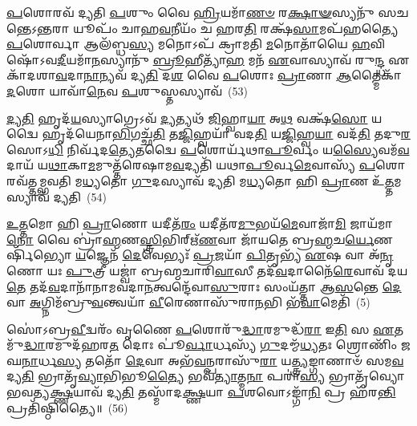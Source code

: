 \-\ul{𑌪}\-𑌶𑍋𑌰𑌵᳴ 𑌦𑍍𑌯𑌤𑌿 \ul{𑌪}\-𑌶𑍁𑌂 𑌵𑍈 \ul{𑌹𑍍𑌰𑌿}\-𑌯𑌮𑌾᳴\-\ul{𑌣}\-\-\ul{𑍞} 𑌰\-\ul{𑌕𑍍𑌷𑌾}\-\-\ul{𑍟}\-𑌸𑍍𑌯𑌨𑍁᳴ 𑌸𑌚𑌨𑍍𑌤𑍇\-𑌽\-\ul{𑌨𑍍𑌤}\-𑌰𑌾 𑌯𑍂𑌪𑌂᳴ 𑌚𑌾𑌹\-\ul{𑌵}\-𑌨𑍀𑌯𑌂᳴ 𑌚 𑌹𑌰\-\ul{𑌤𑌿} 𑌰𑌕𑍍𑌷᳴\-\ul{𑌸𑌾}\-𑌮𑌪᳴𑌹𑌤𑍍𑌯𑍈 \ul{𑌪}\-𑌶𑍋𑌰𑍍𑌵𑌾 𑌆𑌲᳴𑌬𑍍𑌧\-\ul{𑌸𑍍𑌯} 𑌮𑌨𑍋\-𑌽𑌪᳴ 𑌕𑍍𑌰𑌾𑌮𑌤𑌿 \ul{𑌮}\-𑌨𑍋𑌤𑌾᳴𑌯𑍈 \ul{𑌹}\-𑌵𑌿𑌷𑍋᳴\-𑌽𑌵\-\ul{𑌦𑍀}\-𑌯𑌮𑌾᳴\-\ul{𑌨}\-𑌸𑍍𑌯𑌾𑌨𑍁᳴ \ul{𑌬𑍍𑌰𑍂}\-𑌹𑍀𑌤𑍍𑌯𑌾᳴\-\ul{𑌹} 𑌮𑌨᳴ \ul{𑌏}\-𑌵𑌾𑌸𑍍𑌯𑌾𑌵᳴ 𑌰𑍁\-\ul{𑌨𑍍𑌦𑍍𑌧} 𑌏𑌕𑌾᳴\-𑌦𑌶𑌾\-\ul{𑌵}\-𑌦𑌾\-\ul{𑌨𑌾}\-𑌨𑍍𑌯𑌵᳴ 𑌦𑍍𑌯\-\ul{𑌤𑌿} 𑌦\-\ul{𑌶} 𑌵𑍈 \ul{𑌪}\-𑌶𑍋𑌃 \ul{𑌪𑍍𑌰𑌾}\-𑌣𑌾 \ul{𑌆}\-𑌤𑍍𑌮𑍈𑌕𑌾᳴\-\ul{𑌦}\-𑌶𑍋 𑌯𑌾𑌵𑌾᳴\-\ul{𑌨𑍇}\-𑌵 \ul{𑌪}\-𑌶𑍁𑌸𑍍𑌤𑌸𑍍𑌯𑌾𑌵᳴~(53)

\-\ul{𑌦𑍍𑌯}\-\-\ul{𑌤𑌿} 𑌹𑍃𑌦᳴\-\ul{𑌯}\-𑌸𑍍𑌯𑌾𑌗𑍍𑌰𑍇\-𑌽𑌵᳴ \ul{𑌦𑍍𑌯}\-𑌤𑍍𑌯𑌥᳴ \ul{𑌜𑌿}\-𑌹𑍍𑌵𑌾\-\ul{𑌯𑌾} 𑌅\-\ul{𑌥} 𑌵𑌕𑍍𑌷᳴\-\ul{𑌸𑍋} 𑌯𑌦𑍍𑌵𑍈 𑌹𑍃𑌦᳴𑌯𑍇𑌨𑌾\-\ul{𑌭𑌿}\-𑌗𑌚𑍍𑌛᳴\-\ul{𑌤𑌿} 𑌤\-\ul{𑌜𑍍𑌜𑌿}\-𑌹𑍍𑌵𑌯𑌾᳴ 𑌵𑌦\-\ul{𑌤𑌿} 𑌯\-\ul{𑌜𑍍𑌜𑌿}\-𑌹𑍍𑌵\-\ul{𑌯𑌾} 𑌵𑌦᳴\-\ul{𑌤𑌿} 𑌤𑌦𑍁\-\ul{𑌰}\-𑌸𑍋\-𑌽\-\ul{𑌧𑌿} 𑌨𑌿𑌰𑍍𑌵᳴𑌦\-\ul{𑌤𑍍𑌯𑍇}\-𑌤𑌦𑍍𑌵𑍈 \ul{𑌪}\-𑌶𑍋𑌰𑍍𑌯᳴𑌥𑌾\-\ul{𑌪𑍂}\-𑌰𑍍𑌵𑌂 𑌯\-\ul{𑌸𑍍𑌯𑍈}\-𑌵𑌮᳴\-\ul{𑌵}\-𑌦𑌾𑌯᳴ 𑌯\-\ul{𑌥𑌾}\-𑌕𑌾\-\ul{𑌮}\-𑌮𑍁𑌤𑍍𑌤᳴𑌰𑍇𑌷𑌾𑌮\-\ul{𑌵}\-𑌦𑍍𑌯𑌤𑌿᳴ 𑌯𑌥𑌾\-\ul{𑌪𑍂}\-𑌰𑍍𑌵\-\ul{𑌮𑍇}\-𑌵𑌾𑌸𑍍𑌯᳴ \ul{𑌪}\-𑌶𑍋𑌰𑌵᳴𑌤𑍍𑌤𑌮𑍍𑌭𑌵𑌤𑌿 𑌮\-\ul{𑌧𑍍𑌯}\-𑌤𑍋 \ul{𑌗𑍁}\-𑌦𑌸𑍍𑌯𑌾𑌵᳴ 𑌦𑍍𑌯𑌤𑌿 𑌮\-\ul{𑌧𑍍𑌯}\-𑌤𑍋 𑌹𑌿 \ul{𑌪𑍍𑌰𑌾}\-𑌣 𑌉᳴\-\ul{𑌤𑍍𑌤}\-𑌮𑌸𑍍𑌯𑌾𑌵᳴ 𑌦𑍍𑌯𑌤𑌿~(54)

\-\ul{𑌉}\-\-\ul{𑌤𑍍𑌤}\-𑌮𑍋 𑌹𑌿 \ul{𑌪𑍍𑌰𑌾}\-𑌣𑍋 𑌯𑌦𑍀𑌤᳴\-\ul{𑌰𑌂} 𑌯𑌦𑍀𑌤᳴𑌰\-\ul{𑌮𑍁}\-𑌭𑌯᳴\-\ul{𑌮𑍇}\-𑌵𑌾𑌜𑌾᳴\-\ul{𑌮𑌿} 𑌜𑌾𑌯᳴𑌮𑌾\-\ul{𑌨𑍋} 𑌵𑍈 𑌬𑍍𑌰𑌾॑\-\ul{𑌹𑍍𑌮}\-𑌣\-\ul{𑌸𑍍𑌤𑍍𑌰𑌿}\-𑌭𑌿𑌰𑍍\mbox{}𑌋᳴\-\ul{𑌣}\-𑌵𑌾 𑌜𑌾᳴𑌯𑌤𑍇 𑌬𑍍𑌰\-\ul{𑌹𑍍𑌮}\-𑌚\-\ul{𑌰𑍍𑌯𑍇}\-𑌣𑌰𑍍\mbox{}𑌷𑌿᳴𑌭𑍍𑌯𑍋 \ul{𑌯}\-𑌜𑍍𑌞𑍇𑌨᳴ \ul{𑌦𑍇}\-𑌵𑍇𑌭𑍍𑌯𑌃᳴ \ul{𑌪𑍍𑌰}\-𑌜𑌯𑌾᳴ \ul{𑌪𑌿}\-𑌤𑍃𑌭𑍍𑌯᳴ \ul{𑌏}\-𑌷 𑌵𑌾 𑌅᳴\-\ul{𑌨𑍃}\-𑌣𑍋 𑌯𑌃 \ul{𑌪𑍁}\-𑌤𑍍𑌰𑍀 𑌯𑌜𑍍𑌵𑌾॑ 𑌬𑍍𑌰𑌹𑍍𑌮𑌚𑌾𑌰𑌿\-\ul{𑌵𑌾}\-𑌸𑍀 𑌤𑌦᳴\-\ul{𑌵}\-𑌦𑌾𑌨𑍈᳴\-\ul{𑌰𑍇}\-𑌵𑌾𑌵᳴ 𑌦𑌯\-\ul{𑌤𑍇} 𑌤𑌦᳴\-\ul{𑌵}\-𑌦𑌾𑌨𑌾᳴𑌨𑌾𑌮𑌵𑌦𑌾\-\ul{𑌨}\-𑌤𑍍𑌵𑌨𑍍𑌦𑍇᳴𑌵𑌾\-\ul{𑌸𑍁}\-𑌰𑌾𑌃 𑌸𑌂𑌯᳴𑌤𑍍𑌤𑌾 𑌆\-\ul{𑌸}\-𑌨𑍍𑌤𑍇 \ul{𑌦𑍇}\-𑌵𑌾 \ul{𑌅}\-𑌗𑍍𑌨𑌿𑌮᳴𑌬𑍍𑌰𑍁\-\ul{𑌵}\-𑌨𑍍𑌤𑍍𑌵𑌯𑌾᳴ \ul{𑌵𑍀}\-𑌰𑍇𑌣𑌾𑌸𑍁᳴𑌰𑌾\-\ul{𑌨}\-𑌭𑌿 𑌭᳴\-\ul{𑌵𑌾}\-𑌮𑍇𑌤𑌿᳴~(5)

𑌸𑍋॑\-𑌽𑌬𑍍𑌰\-\ul{𑌵𑍀}\-𑌦𑍍𑌵𑌰𑌂᳴ 𑌵𑍃𑌣𑍈 \ul{𑌪}\-𑌶𑍋𑌰𑍁᳴\-\ul{𑌦𑍍𑌧𑌾}\-𑌰𑌮𑍁𑌦𑍍𑌧᳴\-\ul{𑌰𑌾} 𑌇\-\ul{𑌤𑌿} 𑌸 \ul{𑌏}\-𑌤𑌮𑍁᳴\-\ul{𑌦𑍍𑌧𑌾}\-𑌰𑌮𑍁𑌦᳴𑌹𑌰\-\ul{𑌤} 𑌦𑍋𑌃 𑌪𑍂॑\-\ul{𑌰𑍍𑌵𑌾}\-𑌰𑍍𑌧𑌸𑍍𑌯᳴ \ul{𑌗𑍁}\-𑌦𑌮𑍍𑌮᳴\-\ul{𑌧𑍍𑌯}\-𑌤𑌃 𑌶𑍍𑌰𑍋𑌣𑌿𑌂᳴ 𑌜𑌘\-\ul{𑌨𑌾}\-𑌰𑍍𑌧\-\ul{𑌸𑍍𑌯} 𑌤𑌤𑍋᳴ \ul{𑌦𑍇}\-𑌵𑌾 𑌅𑌭᳴\-\ul{𑌵}\-𑌨𑍍𑌪𑌰𑌾𑌸𑍁᳴\-\ul{𑌰𑌾} 𑌯\-\ul{𑌤𑍍𑌤𑍍𑌰𑍍𑌯}\-𑌙𑍍𑌗𑌾𑌣𑌾𑍞᳴ 𑌸𑌮\-\ul{𑌵}\-𑌦𑍍𑌯\-\ul{𑌤𑌿} 𑌭𑍍𑌰𑌾𑌤𑍃᳴\-\ul{𑌵𑍍𑌯𑌾}\-𑌭𑌿𑌭𑍂\-\ul{𑌤𑍍𑌯𑍈} 𑌭𑌵᳴\-\ul{𑌤𑍍𑌯𑌾}\-𑌤𑍍𑌮\-\ul{𑌨𑌾} 𑌪𑌰𑌾॑\-\ul{𑌸𑍍𑌯} 𑌭𑍍𑌰𑌾𑌤𑍃᳴𑌵𑍍𑌯𑍋 𑌭𑌵𑌤𑍍𑌯\-\ul{𑌕𑍍𑌷𑍍𑌣}\-𑌯𑌾𑌵᳴ 𑌦𑍍𑌯\-\ul{𑌤𑌿} 𑌤𑌸𑍍𑌮𑌾᳴𑌦\-\ul{𑌕𑍍𑌷𑍍𑌣}\-𑌯𑌾 \ul{𑌪}\-𑌶𑌵𑍋\-𑌽𑌙𑍍𑌗𑌾᳴\-\ul{𑌨𑌿} 𑌪𑍍𑌰 𑌹᳴𑌰\-\ul{𑌨𑍍𑌤𑌿} 𑌪𑍍𑌰𑌤𑌿᳴𑌷𑍍𑌠𑌿𑌤𑍍𑌯𑍈॥~(56)

{\anuvakamend[{\-\ul{𑌏}\-𑌤𑍗 𑌪᳴\-\ul{𑌶𑍂}\-𑌨𑌾𑍞 𑌸𑌮𑍇᳴𑌧\-\ul{𑌸𑍍𑌯𑍈}\-𑌵 𑌤𑌸𑍍𑌯𑌾𑌵𑍋॑\-\ul{𑌤𑍍𑌤}\-𑌮𑌸𑍍𑌯𑌾𑌵᳴ \ul{𑌦𑍍𑌯}\-𑌤𑍀\-\ul{𑌤𑌿} 𑌪𑌞𑍍𑌚᳴𑌚𑌤𑍍𑌵𑌾𑌰𑌿𑍞𑌶𑌚𑍍𑌚}]}%

